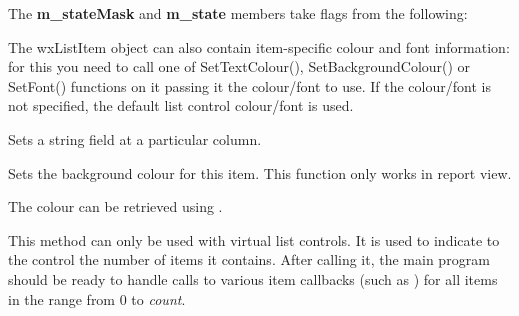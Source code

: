 The {\bf m\_stateMask} and {\bf m\_state} members take flags from the following:

\twocolwidtha{5cm}
\begin{twocollist}\itemsep=0pt
\end{twocollist}

The wxListItem object can also contain item-specific colour and font
information: for this you need to call one of SetTextColour(),
SetBackgroundColour() or SetFont() functions on it passing it the colour/font
to use. If the colour/font is not specified, the default list control
colour/font is used.


Sets a string field at a particular column.


\label{wxlistctrlsetitembackgroundcolour}


Sets the background colour for this item. This function only works in report view.

The colour can be retrieved using
.



\label{wxlistctrlsetitemcount}


This method can only be used with virtual list controls. It is used to indicate
to the control the number of items it contains. After calling it, the main
program should be ready to handle calls to various item callbacks (such as
) for all items in the range
from $0$ to {\it count}.


